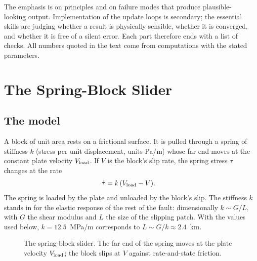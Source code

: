 The emphasis is on principles and on failure modes that produce plausible-looking output. Implementation of the update loops is secondary; the essential skills are judging whether a result is physically sensible, whether it is converged, and whether it is free of a silent error. Each part therefore ends with a list of checks. All numbers quoted in the text come from computations with the stated parameters.

\section{The Spring-Block Slider}
\label{sec:l3-slider}

\subsection{The model}

A block of unit area rests on a frictional surface. It is pulled through a spring of stiffness $k$ (stress per unit displacement, units Pa/m) whose far end moves at the constant plate velocity $V_{\mathrm{load}}$. If $V$ is the block's slip rate, the spring stress $\tau$ changes at the rate
\begin{equation}
\dot\tau = k\,(V_{\mathrm{load}} - V).
\label{eq:l3-spring}
\end{equation}
The spring is loaded by the plate and unloaded by the block's slip. The stiffness $k$ stands in for the elastic response of the rest of the fault: dimensionally $k\sim G/L$, with $G$ the shear modulus and $L$ the size of the slipping patch. With the values used below, $k=12.5$~MPa/m corresponds to $L\sim G/k\approx2.4$~km.

\begin{figure}[ht]
\centering
{}
\caption{The spring-block slider. The far end of the spring moves at the plate velocity $V_{\mathrm{load}}$; the block slips at $V$ against rate-and-state friction.}
\label{fig:l3-slider}
\end{figure}

